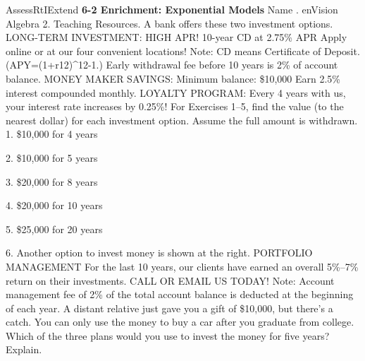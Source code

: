 \documentclass{article}
\newenvironment{te-addendum}[2]{}{}     %
\newcommand{\answer}[1]{}               %
\newcommand{\uncertain}[2]{#1}          %
\begin{document}
\begin{te-addendum}{Assess}{RtIExtend}
\textbf{6-2 Enrichment: Exponential Models}
Name \underline{\hspace{2cm}}. enVision Algebra 2. Teaching Resources.
A bank offers these two investment options.
LONG-TERM INVESTMENT: HIGH APR!
10-year CD at 2.75\% \uncertain{APR}{APY}
Apply online or at our four convenient locations!
Note: CD means Certificate of Deposit.
(APY=(1+\frac r{12})^{12}-1.)
Early withdrawal fee before 10 years is 2\% of account balance.
MONEY MAKER SAVINGS:
Minimum balance: \$10,000
Earn 2.5\% interest compounded monthly.
LOYALTY PROGRAM:
Every 4 years with us, your interest rate increases by \uncertain{0.25\%}{0.2\%; 0.1\%}!
For Exercises 1--5, find the value (to the nearest dollar) for each investment option. Assume the full amount is withdrawn.
1. \$10,000 for 4 years
\answer{1. Long-Term: \$10,938; Money Maker: \$11,051}
2. \$10,000 for 5 years
\answer{2. Long-Term: \$11,243; Money Maker: \$11,359}
3. \$20,000 for 8 years
\answer{3. Long-Term: \$24,417; Money Maker: \$24,668}
4. \$20,000 for 10 years
\answer{4. Long-Term: \$26,323; Money Maker: \$26,191}
5. \$25,000 for 20 years
\answer{5. Long-Term: \$43,305; Money Maker: \$45,517}
6. Another option to invest money is shown at the right.
PORTFOLIO MANAGEMENT
For the last 10 years, our clients have earned an overall 5\%--7\% return on their investments.
CALL OR EMAIL US TODAY!
Note: Account management fee of 2\% of the total account balance is deducted at the beginning of each year.
A distant relative just gave you a gift of \$10,000, but there's a catch. You can only use the money to buy a car after you graduate from college. Which of the three plans would you use to invest the money for five years? Explain.
\answer{6. Sample answer: Money Maker. With Money Maker, I would definitely have \$11,359 after 5 years. With Portfolio Management, if the return was 5\% for each of the five years, I would have \$11,537. I could have more, but I could also have a lot less than that.}
\end{te-addendum}
\end{document}
